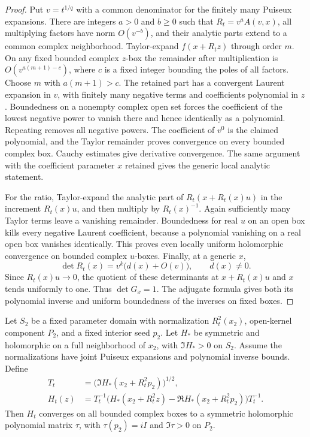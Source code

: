 \begin{proof}
Put $v=t^{1/q}$ with a common denominator for the finitely many
Puiseux expansions.  There are integers $a>0$ and $b\ge0$ such that
$R_t=v^a A(v,x)$, all multiplying factors have norm $O(v^{-b})$,
and their analytic parts extend to a common complex neighborhood.
Taylor-expand $f(x+R_tz)$ through order $m$.  On any fixed bounded
complex $z$-box the remainder after multiplication is
$O(v^{a(m+1)-c})$, where $c$ is a fixed integer bounding the poles
of all factors.  Choose $m$ with $a(m+1)>c$.  The retained part has
a convergent Laurent expansion in $v$, with finitely many negative
terms and coefficients polynomial in $z$.  Boundedness on a nonempty
complex open set forces the coefficient of the lowest negative power
to vanish there and hence identically as a polynomial.  Repeating
removes all negative powers.  The coefficient of $v^0$ is the claimed
polynomial, and the Taylor remainder proves convergence on every
bounded complex box.  Cauchy estimates give derivative convergence.
The same argument with the coefficient parameter $x$ retained gives
the generic local analytic statement.

For the ratio, Taylor-expand the analytic part of
$R_t(x+R_t(x)u)$ in the increment $R_t(x)u$, and then multiply by
$R_t(x)^{-1}$.  Again sufficiently many Taylor terms leave a vanishing
remainder.  Boundedness for real $u$ on an open box kills every negative
Laurent coefficient, because a polynomial vanishing on a real open
box vanishes identically.  This proves even locally uniform
holomorphic convergence on bounded complex $u$-boxes.
Finally, at a generic $x$,
\[
                  \det R_t(x)=v^k\bigl(d(x)+O(v)\bigr),
                         \qquad d(x)\ne0.
\]
Since $R_t(x)u\to0$, the quotient of these determinants at
$x+R_t(x)u$ and $x$ tends uniformly to one.  Thus $\det G_x=1$.
The adjugate formula gives both its polynomial inverse and uniform
boundedness of the inverses on fixed boxes.
\end{proof}

\begin{lemma}\label{win:siegel-normalization}
Let $S_2$ be a fixed parameter domain with normalization $R_t^2(x_2)$,
open-kernel component $P_2$, and a fixed interior seed $p_2$.
Let $H_*$ be symmetric and holomorphic on a full neighborhood of $x_2$,
with $\Im H_*>0$ on $S_2$.  Assume the normalizations have joint
Puiseux expansions and polynomial inverse bounds.  Define
\begin{align}
 T_t&=\bigl(\Im H_*(x_2+R_t^2p_2)\bigr)^{1/2},\label{win:T}\\
 H_t(z)&=T_t^{-1}\bigl(H_*(x_2+R_t^2z)
             -\Re H_*(x_2+R_t^2p_2)\bigr)T_t^{-1}.\label{win:Ht}
\end{align}
Then $H_t$ converges on all bounded complex boxes to a symmetric
holomorphic polynomial matrix $\tau$, with $\tau(p_2)=iI$ and
$\Im\tau>0$ on $P_2$.
\end{lemma}

